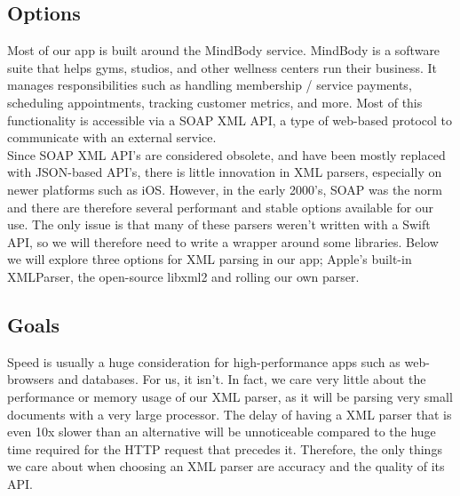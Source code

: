 \documentclass[letterpaper,10pt,titlepage]{article}
\begin{document}
\subsection{Options}
Most of our app is built around the MindBody service. MindBody is a software suite that helps gyms, studios, and other wellness centers run their business. It manages responsibilities such as handling membership / service payments, scheduling appointments, tracking customer metrics, and more. Most of this functionality is accessible via a SOAP XML API, a type of web-based protocol to communicate with an external service.\\

Since SOAP XML API's are considered obsolete, and have been mostly replaced with JSON-based API's, there is little innovation in XML parsers, especially on newer platforms such as iOS. However, in the early 2000's, SOAP was the norm and there are therefore several performant and stable options available for our use. The only issue is that many of these parsers weren't written with a Swift API, so we will therefore need to write a wrapper around some libraries. Below we will explore three options for XML parsing in our app; Apple's built-in XMLParser, the open-source libxml2 and rolling our own parser.

\subsection{Goals}
Speed is usually a huge consideration for high-performance apps such as web-browsers and databases. For us, it isn't. In fact, we care very little about the performance or memory usage of our XML parser, as it will be parsing very small documents with a very large processor. The delay of having a XML parser that is even 10x slower than an alternative will be unnoticeable compared to the huge time required for the HTTP request that precedes it. Therefore, the only things we care about when choosing an XML parser are accuracy and the quality of its API.
\end{document}
